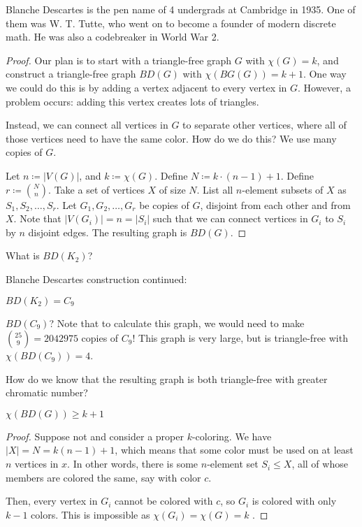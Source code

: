 \documentclass[a4paper]{article}
\begin{document}
\begin{note}
	Blanche Descartes is the pen name of 4 undergrads at Cambridge in 1935. One of them was W. T. Tutte, who went on to become a founder of modern discrete math. He was also a codebreaker in World War 2.
\end{note}

\begin{proof}
	Our plan is to start with a triangle-free graph \( G \) with \( \chi(G) = k \), and construct a triangle-free graph \( BD(G) \) with \( \chi (BG(G))= k+1 \). One way we could do this is by adding a vertex adjacent to every vertex in \( G \). However, a problem occurs: adding this vertex creates lots of triangles. \par
	Instead, we can connect all vertices in \( G \) to separate other vertices, where all of those vertices need to have the same color. How do we do this? We use many copies of \( G \). \par
	Let \( n \coloneq |V(G)| \), and \( k \coloneq \chi (G) \). Define \( N \coloneq k\cdot (n - 1) + 1 \). Define \( r \coloneq \binom{N}{n} \). Take a set of vertices \( X \) of size \( N \). List all \( n \)-element subsets of \( X \) as \( S_{1}, S_{2}, \ldots , S_r \). Let \( G_{1}, G_{2}, \ldots , G_r \) be copies of \( G \), disjoint from each other and from \( X \). Note that \( |V(G_i)| = n = |S_i| \) such that we can connect vertices in \( G_i \) to \( S_i \) by \( n \) disjoint edges. The resulting graph is \( BD(G) \).
\end{proof}

What is \( BD(K_2) \)?


Blanche Descartes construction continued:

\begin{eg}
	\( BD(K_2) = C_9\)
\end{eg}

\begin{eg}
	\( BD(C_9) \)? Note that to calculate this graph, we would need to make \( \binom{25}{9} = 2042975 \) copies of \( C_9 \)! This graph is very large, but is triangle-free with \( \chi(BD(C_9)) = 4 \).
\end{eg}

How do we know that the resulting graph is both triangle-free with greater chromatic number?

\begin{lemma}
	\( \chi(BD(G)) \ge  k+1 \)
\end{lemma}
\begin{proof}
	Suppose not and consider a proper \( k \)-coloring. We have \( |X| = N = k(n-1) + 1 \), which means that some color must be used on at least \( n \) vertices in \( x \). In other words, there is some \( n \)-element set \( S_i \le  X \), all of whose members are colored the same, say with color \( c \). \par
	Then, every vertex in \( G_i \) cannot be colored with \( c \), so \( G_i \) is colored with only \( k - 1 \) colors. This is impossible as \( \chi(G_i) = \chi(G) = k \) \contra.
\end{proof}
\end{document}
